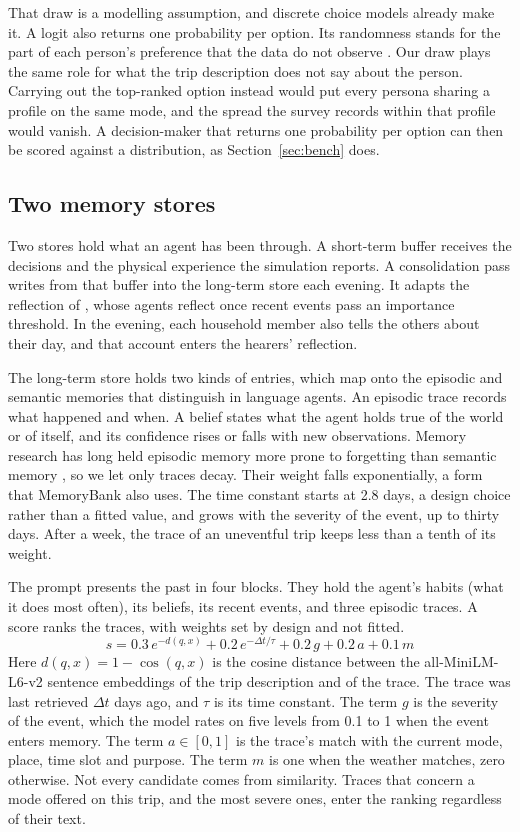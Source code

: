 That draw is a modelling assumption, and discrete choice models already make it. A logit
also returns one probability per option. Its randomness stands for the part of each person's
preference that the data do not observe \citep{mcfadden1974conditional}. Our draw plays the
same role for what the trip description does not say about the person. Carrying out
the top-ranked option instead would put every persona sharing a profile on the same mode, and
the spread the survey records within that profile would vanish. A decision-maker that returns one
probability per option can then be scored against a distribution, as Section~\ref{sec:bench}
does.

\subsection{Two memory stores}
\label{sec:memory}

Two stores hold what an agent has been through. A short-term buffer receives the decisions
and the physical experience the simulation reports. A consolidation pass writes from that
buffer into the long-term store each evening. It adapts the reflection of
\citet{park2023generative}, whose agents reflect once recent events pass an importance
threshold. In the evening, each household member also tells the others about their day, and
that account enters the hearers' reflection.

The long-term store holds two kinds of entries, which map onto the episodic and semantic
memories that \citet{sumers2024coala} distinguish in language agents. An episodic trace
records what happened and when. A belief states what the agent holds true of the world or of
itself, and its confidence rises or falls with new observations. Memory research has long held
episodic memory more prone to forgetting than semantic memory
\citep{renoult2020historical}, so we let only traces decay. Their weight falls
exponentially, a form that MemoryBank \citep{zhong2024memorybank} also uses. The time constant
starts at 2.8 days, a design choice rather than a fitted value, and grows with the severity of
the event, up to thirty days. After a week, the trace of an uneventful trip keeps less than a
tenth of its weight.

The prompt presents the past in four blocks. They hold the agent's habits (what it does most
often), its beliefs, its recent events, and three episodic traces. A score ranks the traces,
with weights set by design and not fitted.
\[
  s = 0.3\,e^{-d(q, x)} + 0.2\,e^{-\Delta t/\tau} + 0.2\,g + 0.2\,a + 0.1\,m
\]
Here $d(q, x) = 1 - \cos(q, x)$ is the cosine distance between the all-MiniLM-L6-v2 sentence
embeddings of the trip description and of the trace. The trace was last retrieved $\Delta t$
days ago, and $\tau$ is its time constant. The term $g$ is the severity of the event, which
the model rates on five levels from 0.1 to 1 when the event enters memory. The term
$a \in [0, 1]$ is the trace's match with the current mode, place, time slot and purpose. The
term $m$ is one when the weather matches, zero otherwise. Not every candidate comes from
similarity. Traces that concern a mode offered on this trip, and the most severe ones, enter
the ranking regardless of their text.

